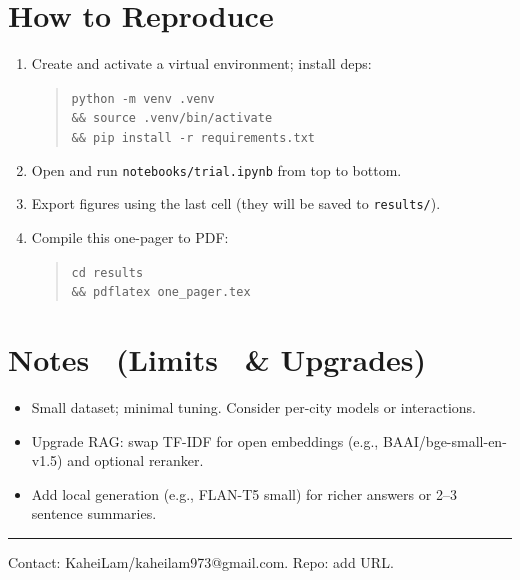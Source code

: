 \documentclass[11pt]{article}
\begin{document}
\section*{How to Reproduce}
\begin{enumerate}[leftmargin=*]
  \item Create and activate a virtual environment; install deps:
  \begin{quote}\small
  \texttt{python -m venv .venv \\ \&\& source .venv/bin/activate \\ \&\& pip install -r requirements.txt}
  \end{quote}
  \item Open and run \texttt{notebooks/trial.ipynb} from top to bottom.
  \item Export figures using the last cell (they will be saved to \texttt{results/}).
  \item Compile this one-pager to PDF:
  \begin{quote}\small
  \texttt{cd results \\ \&\& pdflatex one\_pager.tex}
  \end{quote}
\end{enumerate}

\section*{Notes \ \small (Limits \ \& Upgrades)}
\begin{itemize}[leftmargin=*]
  \item Small dataset; minimal tuning. Consider per-city models or interactions.
  \item Upgrade RAG: swap TF-IDF for open embeddings (e.g., BAAI/bge-small-en-v1.5) and optional reranker.
  \item Add local generation (e.g., FLAN-T5 small) for richer answers or 2--3 sentence summaries.
\end{itemize}

\vfill
\hrule
\small{Contact: KaheiLam/kaheilam973@gmail.com. Repo: add URL.}
\end{document}

